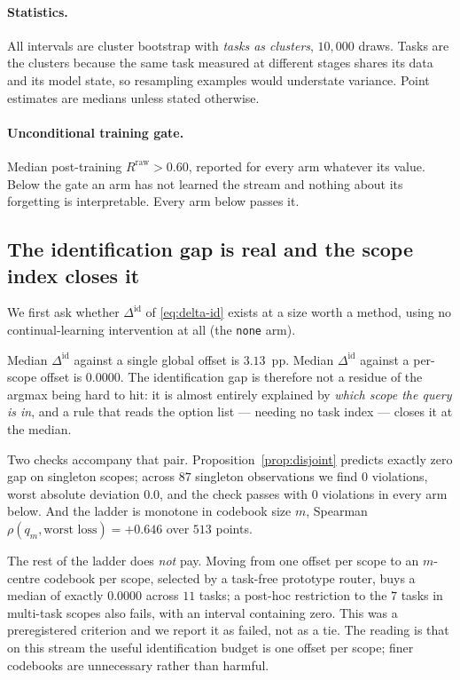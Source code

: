 \paragraph{Statistics.}
All intervals are cluster bootstrap with \emph{tasks as clusters}, $10{,}000$
draws. Tasks are the clusters because the same task measured at different stages
shares its data and its model state, so resampling examples would understate
variance. Point estimates are medians unless stated otherwise.

\paragraph{Unconditional training gate.}
Median post-training $R^{\mathrm{raw}}>0.60$, reported for every arm whatever its
value. Below the gate an arm has not learned the stream and nothing about its
forgetting is interpretable. Every arm below passes it.

\subsection{The identification gap is real and the scope index closes it}
\label{sec:gap-real}

We first ask whether $\Delta^{\mathrm{id}}$ of \eqref{eq:delta-id} exists at a size
worth a method, using no continual-learning intervention at all (the
\texttt{none} arm).

Median $\Delta^{\mathrm{id}}$ against a single global offset is
$\mathbf{3.13}$~pp. Median $\Delta^{\mathrm{id}}$ against a per-scope offset is
$\mathbf{0.0000}$. The identification gap is therefore not a residue of the argmax
being hard to hit: it is almost entirely explained by \emph{which scope the query
is in}, and a rule that reads the option list --- needing no task index --- closes
it at the median.

Two checks accompany that pair. Proposition~\ref{prop:disjoint} predicts exactly
zero gap on singleton scopes; across $87$ singleton observations we find $0$
violations, worst absolute deviation $0.0$, and the check passes with $0$
violations in every arm below. And the ladder is monotone in codebook size $m$,
Spearman $\rho(q_m,\text{worst loss})=+0.646$ over $513$ points.

The rest of the ladder does \emph{not} pay. Moving from one offset per scope to an
$m$-centre codebook per scope, selected by a task-free prototype router, buys a
median of exactly $\mathbf{0.0000}$ across $11$ tasks; a post-hoc restriction to
the $7$ tasks in multi-task scopes also fails, with an interval containing zero.
This was a preregistered criterion and we report it as failed, not as a tie. The
reading is that on this stream the useful identification budget is one offset per
scope; finer codebooks are unnecessary rather than harmful.

